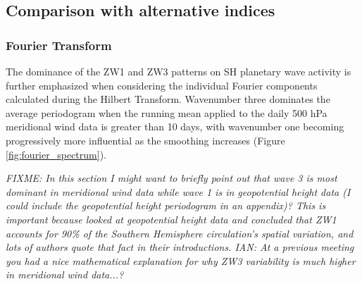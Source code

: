 \subsection{Comparison with alternative indices}

\subsubsection{Fourier Transform}

The dominance of the ZW1 and ZW3 patterns on SH planetary wave activity is further emphasized when considering the individual Fourier components calculated during the Hilbert Transform. Wavenumber three dominates the average periodogram when the running mean applied to the daily 500 hPa meridional wind data is greater than 10 days, with wavenumber one becoming progressively more influential as the smoothing increases (Figure \ref{fig:fourier_spectrum}).


\textit{FIXME: In this section I might want to briefly point out that wave 3 is most dominant in meridional wind data while wave 1 is in geopotential height data (I could include the geopotential height periodogram in an appendix)? This is important because \citet{vanLoon1972} looked at geopotential height data and concluded that ZW1 accounts for 90\% of the Southern Hemisphere circulation's spatial variation, and lots of authors quote that fact in their introductions. IAN: At a previous meeting you had a nice mathematical explanation for why ZW3 variability is much higher in meridional wind data...? }